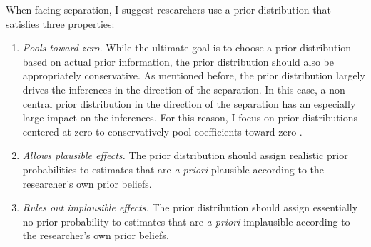 \documentclass[12pt]{article}
\begin{document}
When facing separation, I suggest researchers use a prior distribution that satisfies three properties:
\begin{enumerate}
\item \emph{Pools toward zero.} While the ultimate goal is to choose a prior distribution based on actual prior information, the prior distribution should also be appropriately conservative. As mentioned before, the prior distribution largely drives the inferences in the direction of the separation. In this case, a non-central prior distribution in the direction of the separation has an especially large impact on the inferences. For this reason, I focus on prior distributions centered at zero to conservatively pool coefficients toward zero \citep{GelmanJakulin2007}.
\item \emph{Allows plausible effects.} The prior distribution should assign realistic prior probabilities to estimates that are \textit{a priori} plausible according to the researcher's own prior beliefs.
\item \emph{Rules out implausible effects.} The prior distribution should assign essentially no prior probability to estimates that are \textit{a priori} implausible according to the researcher's own prior beliefs.
\end{enumerate}
\end{document}
